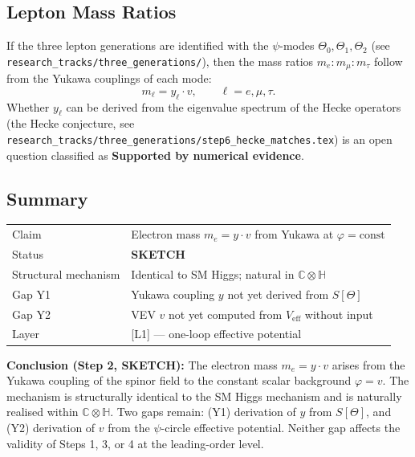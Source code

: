 \documentclass[12pt]{article}
\theoremstyle{definition}
\theoremstyle{remark}
\begin{document}
\subsection{Lepton Mass Ratios}

If the three lepton generations are identified with the $\psi$-modes $\Theta_0, \Theta_1,
\Theta_2$ (see \texttt{research\_tracks/three\_generations/}), then the mass ratios
$m_e : m_\mu : m_\tau$ follow from the Yukawa couplings of each mode:
\begin{equation}
  m_\ell = y_\ell \cdot v,
  \qquad \ell = e, \mu, \tau.
\end{equation}
Whether $y_\ell$ can be derived from the eigenvalue spectrum of the Hecke operators
(the Hecke conjecture, see \texttt{research\_tracks/three\_generations/step6\_hecke\_matches.tex})
is an open question classified as \textbf{Supported by numerical evidence}.

\subsection{Summary}

\begin{center}
\begin{tabular}{ll}
\hline
Claim & Electron mass $m_e = y\cdot v$ from Yukawa at $\varphi = \mathrm{const}$ \\
Status & \textbf{SKETCH} \\
Structural mechanism & Identical to SM Higgs; natural in $\mathbb{C}\otimes\mathbb{H}$ \\
Gap Y1 & Yukawa coupling $y$ not yet derived from $S[\Theta]$ \\
Gap Y2 & VEV $v$ not yet computed from $V_\mathrm{eff}$ without input \\
Layer & [L1] — one-loop effective potential \\
\hline
\end{tabular}
\end{center}

\begin{resultbox}
\textbf{Conclusion (Step 2, SKETCH):}
The electron mass $m_e = y\cdot v$ arises from the Yukawa coupling of the spinor field
to the constant scalar background $\varphi = v$.  The mechanism is structurally identical
to the SM Higgs mechanism and is naturally realised within $\mathbb{C}\otimes\mathbb{H}$.
Two gaps remain: (Y1) derivation of $y$ from $S[\Theta]$, and (Y2) derivation of $v$
from the $\psi$-circle effective potential.  Neither gap affects the validity of Steps 1,
3, or 4 at the leading-order level.
\end{resultbox}

\ifdefined\INCLUDEMODE\else
  
\end{document}
